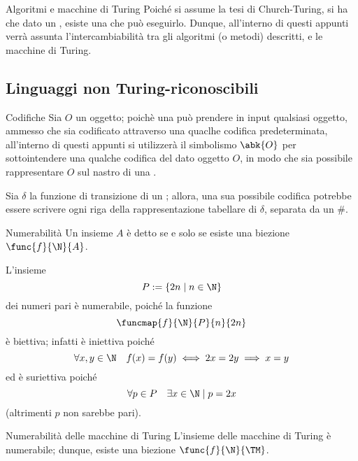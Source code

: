 \documentclass[a4paper, 12pt]{report}
\begin{document}
    \begin{framedobs}[label={alg tm}]{Algoritmi e macchine di Turing}
        Poiché si assume la tesi di Church-Turing, si ha che dato un , esiste una  che può eseguirlo. Dunque, all'interno di questi appunti verrà assunta l'intercambiabilità tra gli algoritmi (o metodi) descritti, e le macchine di Turing.
    \end{framedobs}

    \subsection{Linguaggi non Turing-riconoscibili}
    
    \begin{framedobs}{Codifiche}
        Sia $O$ un oggetto; poichè una \TM può prendere in input qualsiasi oggetto, ammesso che sia codificato attraverso una quaclhe codifica predeterminata, all'interno di questi appunti si utilizzerà il simbolismo $\abk{O}$ per sottointendere una qualche codifica del dato oggetto $O$, in modo che sia possibile rappresentare $O$ sul nastro di una \TM.
    \end{framedobs}

    \begin{example}
        Sia $\delta$ la funzione di transizione di un \DFA; allora, una sua possibile codifica potrebbe essere scrivere ogni riga della rappresentazione tabellare di $\delta$, separata da un \ttt \#.
    \end{example}

    \begin{frameddefn}{Numerabilità}
        Un insieme $A$ è detto  se e solo se esiste una biezione $\func{f}{\N}{A}$.
    \end{frameddefn}

    \begin{example}
        L'insieme $$P := \{2n \mid n \in \N\}$$ dei numeri pari è numerabile, poiché la funzione $$\funcmap{f}{\N}{P}{n}{2n}$$ è biettiva; infatti è iniettiva poiché $$\forall x, y \in \N \quad f(x) = f(y) \iff 2x = 2y \implies x = y$$ ed è suriettiva poiché $$\forall p \in P \quad \exists x \in \N \mid p = 2x$$ (altrimenti $p$ non sarebbe pari).
    \end{example}

    \begin{framedlem}[label={num tm}]{Numerabilità delle macchine di Turing}
        L'insieme delle macchine di Turing è numerabile; dunque, esiste una biezione $\func{f}{\N}{\TM}$.
    \end{framedlem}
\end{document}
